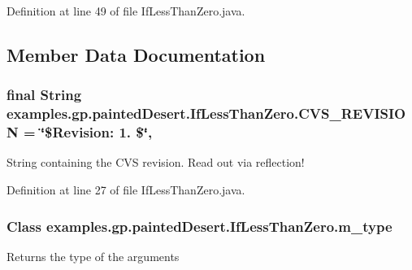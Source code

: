 Definition at line 49 of file If\-Less\-Than\-Zero.\-java.



\subsection{Member Data Documentation}
\hypertarget{classexamples_1_1gp_1_1painted_desert_1_1_if_less_than_zero_a93bcc270ca4f73efa52074dd146b57a8}{
\subsubsection[{C\-V\-S\-\_\-\-R\-E\-V\-I\-S\-I\-O\-N}]{\setlength{\rightskip}{0pt plus 5cm}final String examples.\-gp.\-painted\-Desert.\-If\-Less\-Than\-Zero.\-C\-V\-S\-\_\-\-R\-E\-V\-I\-S\-I\-O\-N = \char`\"{}\$Revision\-: 1. \$\char`\"{}\hspace{0.3cm}{\ttfamily [static]}, {\ttfamily [private]}}}\label{classexamples_1_1gp_1_1painted_desert_1_1_if_less_than_zero_a93bcc270ca4f73efa52074dd146b57a8}
String containing the C\-V\-S revision. Read out via reflection! 

Definition at line 27 of file If\-Less\-Than\-Zero.\-java.

\hypertarget{classexamples_1_1gp_1_1painted_desert_1_1_if_less_than_zero_ad145341a3a5ceb25ba7e3e35ba7b517c}{
\subsubsection[{m\-\_\-type}]{\setlength{\rightskip}{0pt plus 5cm}Class examples.\-gp.\-painted\-Desert.\-If\-Less\-Than\-Zero.\-m\-\_\-type\hspace{0.3cm}{\ttfamily [private]}}}\label{classexamples_1_1gp_1_1painted_desert_1_1_if_less_than_zero_ad145341a3a5ceb25ba7e3e35ba7b517c}
Returns the type of the arguments 

